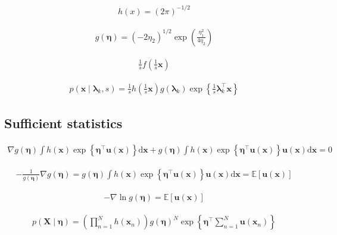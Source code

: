 \documentclass{article}
\begin{document}
\begin{align*}
h(x) = (2 \pi)^{-1/2} 
\tag{3.166}
\end{align*}

\begin{align*}
g(\boldsymbol{\eta}) = \left( -2 \eta_2 \right)^{1/2} \exp \left( \frac{\eta_1^2}{4 \eta_2} \right) 
\tag{3.167}
\end{align*}

\begin{align*}
\frac{1}{s} f \left( \frac{1}{s} \mathbf{x} \right) 
\tag{3.168}
\end{align*}

\begin{align*}
p(\mathbf{x} \mid \boldsymbol{\lambda}_k, s) = \frac{1}{s} h \left( \frac{1}{s} \mathbf{x} \right) g(\boldsymbol{\lambda}_k) \exp \left\{ \frac{1}{s} \boldsymbol{\lambda}_k^{\top} \mathbf{x} \right\} 
\tag{3.169}
\end{align*}

\subsection{Sufficient statistics}

\begin{align*}
\nabla g(\boldsymbol{\eta}) \int h(\mathbf{x}) \exp \left\{ \boldsymbol{\eta}^{\top} \mathbf{u}(\mathbf{x}) \right\} \mathrm{d} \mathbf{x} + g(\boldsymbol{\eta}) \int h(\mathbf{x}) \exp \left\{ \boldsymbol{\eta}^{\top} \mathbf{u}(\mathbf{x}) \right\} \mathbf{u}(\mathbf{x}) \mathrm{d} \mathbf{x} = 0
\tag{3.170}
\end{align*}

\begin{align*}
-\frac{1}{g(\boldsymbol{\eta})} \nabla g(\boldsymbol{\eta}) = g(\boldsymbol{\eta}) \int h(\mathbf{x}) \exp \left\{ \boldsymbol{\eta}^{\top} \mathbf{u}(\mathbf{x}) \right\} \mathbf{u}(\mathbf{x}) \mathrm{d} \mathbf{x} = \mathbb{E}[\mathbf{u}(\mathbf{x})] 
\tag{3.171}
\end{align*}

\begin{align*}
-\nabla \ln g(\boldsymbol{\eta})=\mathbb{E}[\mathbf{u}(\mathbf{x})]
\tag{3.172}
\end{align*}

\begin{align*}
p(\mathbf{X} \mid \boldsymbol{\eta})=\left(\prod_{n=1}^{N} h\left(\mathbf{x}_{n}\right)\right) g(\boldsymbol{\eta})^{N} \exp \left\{\boldsymbol{\eta}^{\top} \sum_{n=1}^{N} \mathbf{u}\left(\mathbf{x}_{n}\right)\right\}
\tag{3.173}
\end{align*}
\end{document}
